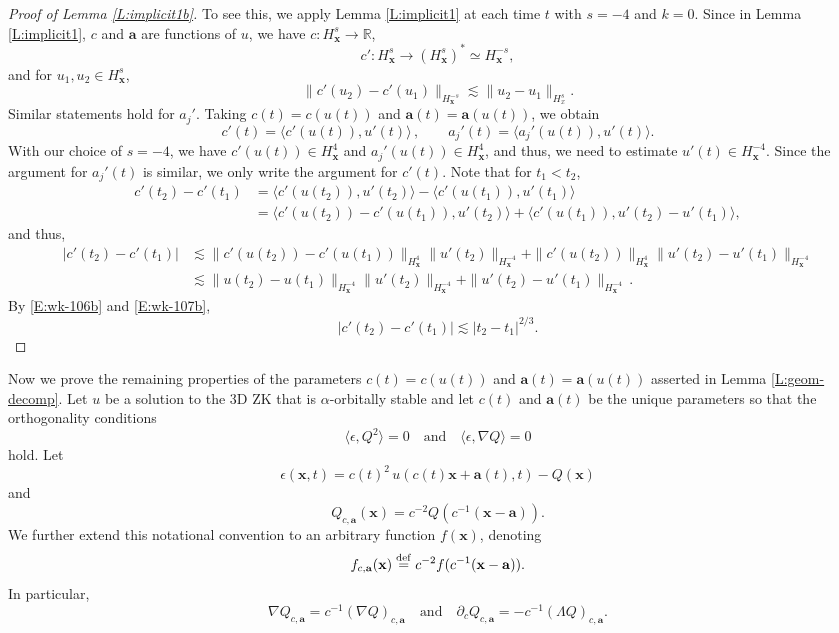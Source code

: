 \documentclass[12pt,letterpaper]{amsart}
\newcommand{\la}{\langle}
\newcommand{\ra}{\rangle}
\newcommand{\defeq}{\stackrel{\rm{def}}{=}}
\theoremstyle{remark}
\numberwithin{equation}{section}
\numberwithin{theorem}{section}
\numberwithin{table}{section}
\begin{document}
\begin{proof}[Proof of Lemma \ref{L:implicit1b}]
To see this, we apply Lemma \ref{L:implicit1} at each time $t$ with  $s=-4$ and $k=0$.   Since in Lemma \ref{L:implicit1}, $c$ and $\mathbf{a}$ are functions of $u$, we have $c: H_{\mathbf{x}}^s \to \mathbb{R}$,
$$
c': H_{\mathbf{x}}^s \to   (H_{\mathbf{x}}^s)^* \simeq H_{\mathbf{x}}^{-s},
$$ 
and for $u_1, u_2 \in H_{\mathbf{x}}^s$,
$$
\| c'(u_2)-c'(u_1) \|_{H_{\mathbf{x}}^{-s}} \lesssim \| u_2 - u_1 \|_{H_x^s}.
$$
Similar statements hold for $a_j'$.    
Taking $c(t) = c(u(t))$ and $\mathbf{a}(t) = \mathbf{a}(u(t))$, we obtain
$$
c'(t) = \la c'(u(t)),u'(t)\ra \,, \qquad a_j'(t) = \la a_j'(u(t)), u'(t) \ra. 
$$ 
With our choice of $s=-4$, we have $c'(u(t)) \in H_{\mathbf{x}}^4$ and $a_j'(u(t)) \in H_{\mathbf{x}}^4$, and thus, we need to estimate $u'(t) \in H_{\mathbf{x}}^{-4}$.    Since the argument for $a_j'(t)$ is similar, we only write the argument for $c'(t)$.  Note that for $t_1<t_2$,
\begin{align*}
c'(t_2) - c'(t_1) &= \la c'(u(t_2)),u'(t_2) \ra - \la c'(u(t_1)),u'(t_1)\ra\\
&= \la c'(u(t_2))-c'(u(t_1)), u'(t_2) \ra + \la c'(u(t_1)), u'(t_2)-u'(t_1) \ra,
\end{align*}
and thus,
\begin{align*}
|c'(t_2)-c'(t_1)| &\lesssim \| c'(u(t_2)) - c'(u(t_1))\|_{H_{\mathbf{x}}^4} \| u'(t_2) \|_{H_{\mathbf{x}}^{-4}} + \| c'(u(t_2)) \|_{H_{\mathbf{x}}^4} \|u'(t_2)-u'(t_1) \|_{H_{\mathbf{x}}^{-4}} \\
&\lesssim \|u(t_2) - u(t_1) \|_{H_{\mathbf{x}}^{-4}}  \| u'(t_2) \|_{H_{\mathbf{x}}^{-4}} + \|u'(t_2)-u'(t_1) \|_{H_{\mathbf{x}}^{-4}} \, .
\end{align*}
By \eqref{E:wk-106b} and \eqref{E:wk-107b},
$$
|c'(t_2)-c'(t_1)| \lesssim |t_2-t_1|^{2/3}.
$$
\end{proof}



Now we prove the remaining properties of the parameters $c(t)=c(u(t))$ and $\mathbf{a}(t)=\mathbf{a}(u(t))$ asserted in Lemma \ref{L:geom-decomp}.  Let $u$ be a solution to the 3D ZK that is $\alpha$-orbitally stable and let $c(t)$ and $\mathbf{a}(t)$ be the unique parameters so that the orthogonality conditions
$$
\la \epsilon, Q^2 \ra =0 \quad \mbox{and} \quad \la \epsilon, \nabla Q \ra=0
$$
hold.
Let
\begin{equation}
\label{E:ep-def}
\epsilon(\mathbf{x},t) = c(t)^2 \,u\left(c(t) \mathbf{x} + \mathbf{a}(t),t\right) - Q(\mathbf{x})
\end{equation}
and
$$
Q_{c, \mathbf{a}}(\mathbf{x}) = c^{-2}Q(c^{-1}(\mathbf{x}-\mathbf{a})).
$$
We further extend this notational convention to an arbitrary function $f(\mathbf{x})$, denoting 
\begin{equation}
\label{E:shift-notation}
f_{c, \mathbf{a}}(\mathbf{x}) \defeq c^{-2}f(c^{-1}(\mathbf{x}-\mathbf{a})).
\end{equation}
In particular,
$$
\nabla Q_{c,\mathbf{a}} = c^{-1} (\nabla Q)_{c,\mathbf{a}} \quad \mbox{and} \quad \partial_c Q_{c,\mathbf{a}} = -c^{-1} (\Lambda Q)_{c,\mathbf{a}}.
$$
\end{document}
